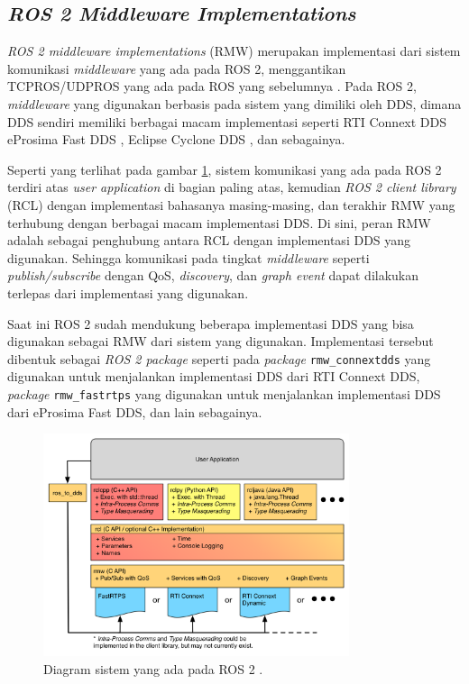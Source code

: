 \subsection{\emph{ROS 2 Middleware Implementations}}
\label{subsec:rmw}

\emph{ROS 2 middleware implementations} (RMW) merupakan implementasi dari sistem komunikasi \emph{middleware} yang ada pada ROS 2,
  menggantikan TCPROS/UDPROS yang ada pada ROS yang sebelumnya \citep{url:rmwdesign}.
Pada ROS 2, \emph{middleware} yang digunakan berbasis pada sistem yang dimiliki oleh DDS,
  dimana DDS sendiri memiliki berbagai macam implementasi seperti RTI Connext DDS \citep{url:rmwdesign} eProsima Fast DDS \citep{url:fastdds},
  Eclipse Cyclone DDS \citep{url:cyclonedds},
  dan sebagainya.

Seperti yang terlihat pada gambar \ref{fig:diagramsistemros2},
  sistem komunikasi yang ada pada ROS 2 terdiri atas \emph{user application} di bagian paling atas,
  kemudian \emph{ROS 2 client library} (RCL) dengan implementasi bahasanya masing-masing,
  dan terakhir RMW yang terhubung dengan berbagai macam implementasi DDS.
Di sini, peran RMW adalah sebagai penghubung antara RCL dengan implementasi DDS yang digunakan.
Sehingga komunikasi pada tingkat \emph{middleware} seperti \emph{publish/subscribe} dengan QoS, \emph{discovery},
  dan \emph{graph event} dapat dilakukan terlepas dari implementasi yang digunakan.

Saat ini ROS 2 sudah mendukung beberapa implementasi DDS yang bisa digunakan sebagai RMW dari sistem yang digunakan.
  Implementasi tersebut dibentuk sebagai \emph{ROS 2 package} seperti pada \emph{package} \lstinline{rmw_connextdds} yang digunakan untuk menjalankan implementasi DDS dari RTI Connext DDS,
  \emph{package} \lstinline{rmw_fastrtps} yang digunakan untuk menjalankan implementasi DDS dari eProsima Fast DDS,
  dan lain sebagainya.

\begin{figure}
  \centering
  \includegraphics[width=0.8\textwidth,keepaspectratio]{gambar/diagram-sistem-ros2.png}
  \caption{Diagram sistem yang ada pada ROS 2 \citep{url:ros2interfacesconcept}.}
  \label{fig:diagramsistemros2}
\end{figure}
